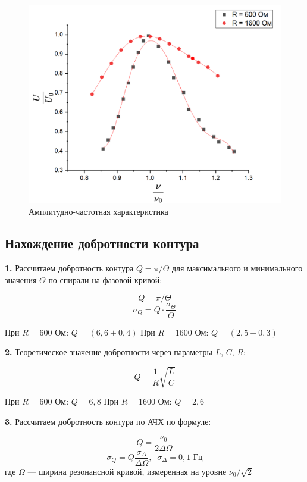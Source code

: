 \documentclass[a4paper, 12pt]{article}
\begin{document}
\begin{figure}[H]
\begin{center}
\includegraphics[width=\textwidth]{G4.png}
\caption{Амплитудно-частотная характеристика} \label{G4}
\end{center}
\end{figure}



\subsection{Нахождение добротности контура}

\textbf{1.} Рассчитаем добротность контура $Q = \pi/\Theta$ для максимального и минимального значения $\Theta$ по спирали на фазовой кривой:

$$Q = \pi/\Theta$$
$$\sigma_Q = Q \cdot \frac{\sigma_\Theta}{\Theta}$$

При $R = 600$ Ом: $Q = (6,6 \pm 0,4)$
При $R = 1600$ Ом: $Q = (2,5 \pm 0,3)$

\textbf{2.} Теоретическое значение добротности через параметры $L$, $C$, $R$:

$$Q = \frac{1}{R}\sqrt{\frac{L}{C}}$$

При $R = 600$ Ом: $Q = 6,8$
При $R = 1600$ Ом: $Q = 2,6$

\textbf{3.} Рассчитаем добротность контура по АЧХ по формуле:

$$Q = \frac{\nu_0}{2\Delta\Omega}$$
$$\sigma_Q = Q \frac{\sigma_\Delta}{\Delta\Omega}, \;\; \sigma_\Delta = 0,1 \text{ Гц}$$
где $\Omega$ --- ширина резонансной кривой, измеренная на уровне $\nu_0/\sqrt{2}$
\end{document}
